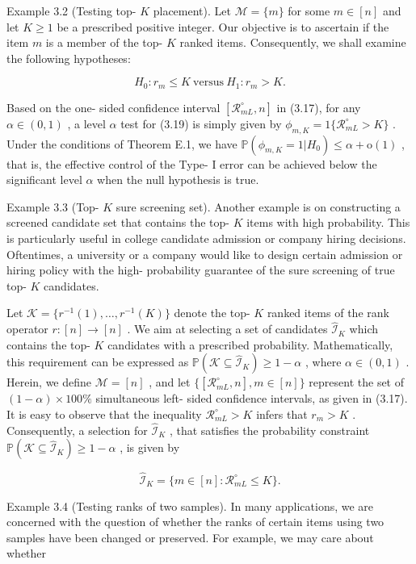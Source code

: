 Example 3.2 (Testing top- \(K\) placement). Let \(\mathcal{M} = \{m\}\)
for some \(m \in [n]\) and let \(K \geq 1\) be a prescribed positive
integer. Our objective is to ascertain if the item \(m\) is a member of
the top- \(K\) ranked items. Consequently, we shall examine the
following hypotheses:

\[
H_{0}:r_{m}\leq K\mathrm{~versus~}H_{1}:r_{m} > K. \tag{3.19}
\]

Based on the one- sided confidence interval
\([\mathcal{R}_{mL}^{\circ}, n]\) in (3.17), for any
\(\alpha \in (0,1)\) , a level \(\alpha\) test for (3.19) is simply
given by \(\phi_{m,K} = 1\{\mathcal{R}_{mL}^{\circ} > K\}\) . Under the
conditions of Theorem E.1, we have
\(\mathbb{P}(\phi_{m,K} = 1|H_{0}) \leq \alpha + \mathrm{o}(1)\) , that
is, the effective control of the Type- I error can be achieved below the
significant level \(\alpha\) when the null hypothesis is true.

Example 3.3 (Top- \(K\) sure screening set). Another example is on
constructing a screened candidate set that contains the top- \(K\) items
with high probability. This is particularly useful in college candidate
admission or company hiring decisions. Oftentimes, a university or a
company would like to design certain admission or hiring policy with the
high- probability guarantee of the sure screening of true top- \(K\)
candidates.

Let \(\mathcal{K} = \{r^{- 1}(1),\ldots ,r^{- 1}(K)\}\) denote the top-
\(K\) ranked items of the rank operator \(r:[n]\to [n]\) . We aim at
selecting a set of candidates \(\widehat{\mathcal{I}}_K\) which contains
the top- \(K\) candidates with a prescribed probability. Mathematically,
this requirement can be expressed as
\(\mathbb{P}(\mathcal{K}\subseteq \widehat{\mathcal{I}}_K)\geq 1 - \alpha\)
, where \(\alpha \in (0,1)\) . Herein, we define \(\mathcal{M} = [n]\) ,
and let \(\{[\mathcal{R}_{mL}^{\circ},n],m\in [n]\}\) represent the set
of \((1 - \alpha)\times 100\%\) simultaneous left- sided confidence
intervals, as given in (3.17). It is easy to observe that the inequality
\(\mathcal{R}_{mL}^{\circ} > K\) infers that \(r_m > K\) . Consequently,
a selection for \(\widehat{\mathcal{I}}_K\) , that satisfies the
probability constraint
\(\mathbb{P}(\mathcal{K}\subseteq \widehat{\mathcal{I}}_K)\geq 1 - \alpha\)
, is given by

\[
\widehat{\mathcal{I}}_K = \{m\in [n]:\mathcal{R}_{mL}^{\circ}\leq K\} .
\]

Example 3.4 (Testing ranks of two samples). In many applications, we are
concerned with the question of whether the ranks of certain items using
two samples have been changed or preserved. For example, we may care
about whether

